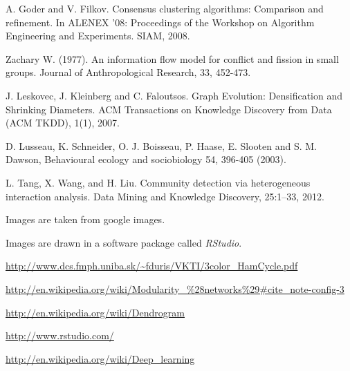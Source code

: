 \begin{thebibliography}{1}
		  A. Goder and V. Filkov. Consensus clustering algorithms: Comparison and refinement. In ALENEX '08: Proceedings of the Workshop on Algorithm Engineering and Experiments. SIAM, 2008.
		 
		 Zachary W. (1977). An information flow model for conflict and fission in small groups. Journal of Anthropological Research, 33, 452-473.
		 
		 J. Leskovec, J. Kleinberg and C. Faloutsos. Graph Evolution: Densification and Shrinking Diameters. ACM Transactions on Knowledge Discovery from Data (ACM TKDD), 1(1), 2007.
		 
		 D. Lusseau, K. Schneider, O. J. Boisseau, P. Haase, E. Slooten and S. M. Dawson, Behavioural ecology and sociobiology 54, 396-405 (2003).
		 
		 L. Tang, X. Wang, and H. Liu. Community detection via heterogeneous interaction analysis. Data Mining and Knowledge Discovery, 25:1–33, 2012.
		 
		 Images are taken from google images.
		 
		 Images are drawn in a software package called \emph{RStudio}.
		 
		 \url{http://www.dcs.fmph.uniba.sk/~fduris/VKTI/3color_HamCycle.pdf}
		 
		 \url{http://en.wikipedia.org/wiki/Modularity_\%28networks\%29#cite_note-config-3}
		 
		 \url{http://en.wikipedia.org/wiki/Dendrogram}
		 
		 \url{http://www.rstudio.com/}
		 
		 \url{http://en.wikipedia.org/wiki/Deep_learning}
		
\end{thebibliography}
